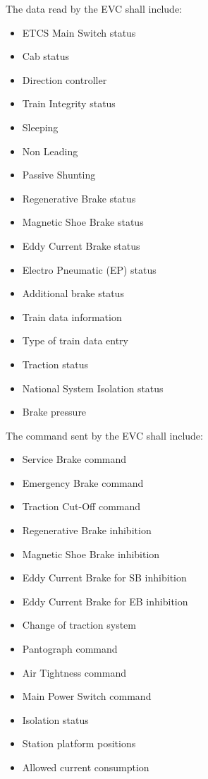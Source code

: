 \documentclass{template/openetcs_article}
\begin{document}
		The data read by the EVC shall include:
		\begin{itemize}
			\item ETCS Main Switch status
			\item Cab status
			\item Direction controller
			\item Train Integrity status
			\item Sleeping
			\item Non Leading
			\item Passive Shunting
			\item Regenerative Brake status
			\item Magnetic Shoe Brake status
			\item Eddy Current Brake status
			\item Electro Pneumatic (EP) status
			\item Additional brake status
			\item Train data information
			\item Type of train data entry
			\item Traction status
			\item National System Isolation status
			\item Brake pressure
		\end{itemize}
		
		The command sent by the EVC shall include:
		\begin{itemize}
			\item Service Brake command
			\item Emergency Brake command
			\item Traction Cut-Off command
			\item Regenerative Brake inhibition
			\item Magnetic Shoe Brake inhibition
			\item Eddy Current Brake for SB inhibition
			\item Eddy Current Brake for EB inhibition
			\item Change of traction system
			\item Pantograph command
			\item Air Tightness command
			\item Main Power Switch command
			\item Isolation status
			\item Station platform positions
			\item Allowed current consumption				
		\end{itemize}						
\end{document}
